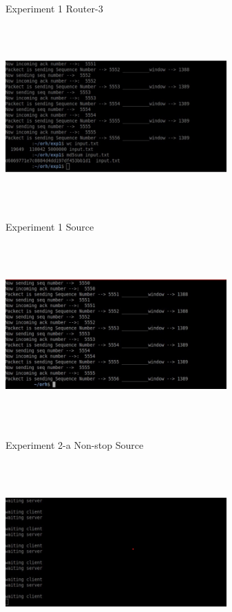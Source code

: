 \documentclass[letterpaper, 12 pt, conference]{ieeeconf}  %
\begin{document}
\begin{center}
Experiment 1 Router-3
\end{center}


\includegraphics[width=8.5cm, height=7cm]{Experiment 1-source.png}

\begin{center}
Experiment 1 Source
\end{center}


\includegraphics[width=8.5cm, height=7cm]{Experiment 2-a-source.png}

\begin{center}
Experiment 2-a Non-stop Source
\end{center}


\includegraphics[width=8.5cm, height=7cm]{Experiment 2-a-r1.png}
\end{document}

